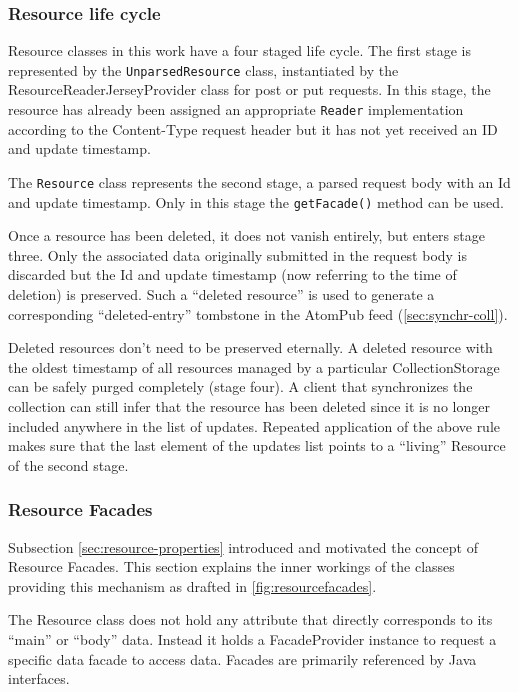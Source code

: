 \documentclass[11pt,a4paper,headsepline,twoside]{scrartcl}		%
\begin{document}
\subsubsection{Resource life cycle}
\label{sec:resource-life-cycle}

Resource classes in this work have a four staged life cycle. The first stage is
represented by the \lstinline:UnparsedResource: class, instantiated by the
ResourceReaderJerseyProvider class for post or put requests. In this stage, the
resource has already been assigned an appropriate \lstinline:Reader:
implementation according to the Content-Type request header but it has not yet
received an ID and update timestamp.

The \lstinline:Resource: class represents the second stage, a parsed request
body with an Id and update timestamp. Only in this stage the
\lstinline:getFacade(): method can be used.

Once a resource has been deleted, it does not vanish entirely, but enters stage
three. Only the associated data originally submitted in the request body is
discarded but the Id and update timestamp (now referring to the time of
deletion) is preserved. Such a ``deleted resource'' is used to generate a
corresponding ``deleted-entry'' tombstone in the AtomPub feed
(\autoref{sec:synchr-coll}).

Deleted resources don't need to be preserved eternally. A deleted resource with
the oldest timestamp of all resources managed by a particular CollectionStorage
can be safely purged completely (stage four). A client that synchronizes the
collection can still infer that the resource has been deleted since it is no
longer included anywhere in the list of updates. Repeated application of the
above rule makes sure that the last element of the updates list points to a
``living'' Resource of the second stage.

\subsubsection{Resource Facades}
\label{sec:resourcefacades}

Subsection \ref{sec:resource-properties} introduced and motivated the concept of
Resource Facades. This section explains the inner workings of the classes
providing this mechanism as drafted in \autoref{fig:resourcefacades}.

The Resource class does not hold any attribute that directly corresponds to its
``main'' or ``body'' data. Instead it holds a FacadeProvider instance to request
a specific data facade to access data. Facades are primarily referenced by Java
interfaces.
\end{document}
